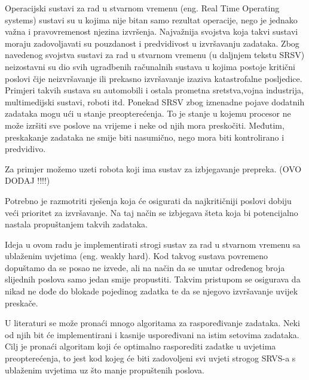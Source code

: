 \documentclass[../zavrsni.tex]{subfiles}
\begin{document}
Operacijski sustavi za rad u stvarnom vremenu (eng. Real Time Operating systems) sustavi su u kojima nije bitan samo
rezultat operacije, nego je jednako važna i pravovremenost njezina izvršenja. Najvažnija svojstva koja takvi sustavi moraju
zadovoljavati su pouzdanost i predvidivost u izvršavanju zadataka.
Zbog navedenog svojstva sustavi za rad u stvarnom vremenu (u daljnjem tekstu SRSV) neizostavni su dio svih ugradbenih 
računalnih sustava u kojima postoje kritični poslovi čije neizvršavanje ili prekasno izvršavanje izaziva katastrofalne
posljedice. Primjeri takvih sustava su automobili i ostala prometna sretstva,vojna industrija, multimedijski sustavi, roboti itd. 
Ponekad SRSV zbog iznenadne pojave dodatnih zadataka mogu ući u stanje preopterećenja. To je stanje u kojemu procesor ne može 
izršiti sve poslove na vrijeme i neke od njih mora preskočiti. Međutim, preskakanje zadataka ne smije biti nasumično, nego
mora biti kontrolirano i predvidivo. 

Za primjer možemo uzeti robota koji ima sustav za izbjegavanje prepreka. (OVO DODAJ !!!!)

Potrebno je razmotriti rješenja koja će osigurati da najkritičniji poslovi dobiju veći prioritet za izvršavanje. 
Na taj način se izbjegava šteta koja bi potencijalno nastala propuštanjem takvih zadataka. 

Ideja u ovom radu je implementirati strogi sustav za rad u stvarnom vremenu sa ublaženim uvjetima (eng. weakly hard). Kod takvog sustava
povremeno dopuštamo da se posao ne izvede, ali na način da se unutar određenog broja slijednih poslova samo jedan smije propustiti.
Takvim pristupom se osigurava da nikad ne dođe do blokade pojedinog zadatka te da se njegovo izvršavanje uvijek preskače.

U literaturi se može pronaći mnogo algoritama za raspoređivanje zadataka. Neki od njih bit će implementirani i kasnije uspoređivani na istim
setovima zadataka. Cilj je pronaći algoritam koji će optimalno rasporediti zadatke u uvjetima preopterećenja, to jest kod kojeg će biti 
zadovoljeni svi uvjeti strogog SRVS-a s ublaženim uvjetima uz što manje propuštenih poslova. 
\end{document}

